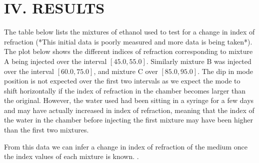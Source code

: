 \section*{IV. RESULTS}
\hspace{0.25in}
The table below lists the mixtures of ethanol used to test for a change in index of refraction (*This initial data is poorly measured and more data is being taken*). The plot below shows the different indices of refraction corresponding to mixture A being injected over the interval $[45.0, 55.0]$. Similarly mixture B was injected over the interval $[60.0, 75.0]$, and mixture C over $[85.0, 95.0]$. The dip in mode position is not expected over the first two intervals as we expect the mode to shift horizontally if the index of refraction in the chamber becomes larger than the original. However, the water used had been sitting in a syringe for a few days and may have actually increased in index of refraction, meaning that the index of the water in the chamber before injecting the first mixture may have been higher than the first two mixtures.

\hspace{0.1in}
From this data we can infer a change in index of refraction of the medium once the index values of each mixture is known. .




